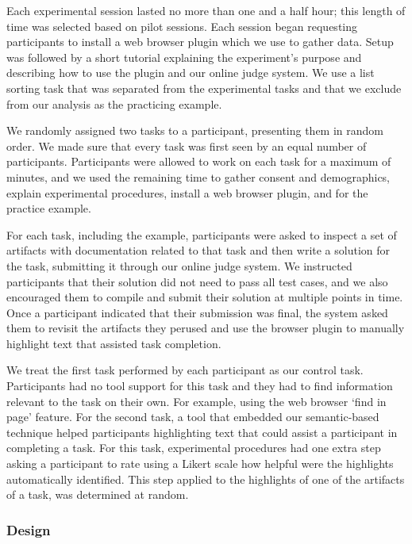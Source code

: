 Each experimental session lasted no more than one and a half hour; this length of time was selected based on \red{\#} pilot sessions. 
Each session began requesting participants to install a web browser plugin which we use to gather data. Setup was followed by a short tutorial explaining the experiment's purpose and describing how to use the plugin and our online judge system. We use a list sorting task that was separated from the experimental tasks and that we exclude from our analysis as the practicing example. 


We randomly assigned two tasks to a participant, presenting them in random order.  We made sure that every task was first seen by an equal number of participants. Participants were allowed to work on each task for a maximum of  minutes, and we used the remaining time to gather consent and demographics, explain experimental procedures, install a web browser plugin, and for the practice example. 



For each task, including the example, participants were asked to inspect a set of artifacts with documentation related to that task and then write a solution for the task, submitting it through our online judge system. We instructed participants that their solution did not need to pass all test cases, and we also encouraged them to compile and submit their solution at multiple points in time. Once a participant indicated that their submission was final, the system asked them to revisit the artifacts they perused and use the browser plugin to manually highlight text that assisted task completion.


We treat the first task performed by each participant as our control task.
Participants had no tool support for this task and they had to find information relevant to the task on their own. For example, using the web browser `find in page' feature.
For the second task, a tool that embedded our semantic-based technique helped participants 
highlighting text that could assist a participant in completing a task.
For this task, experimental procedures had one extra step asking a participant to rate using a Likert scale how helpful were the highlights automatically identified. This step applied to 
the highlights of one of the artifacts of a task, was determined at random. 







\subsubsection{Design}


